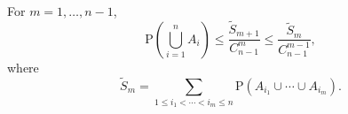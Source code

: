 For $m = 1, \ldots, n-1$,
$$\text{P}\left(\bigcup_{i=1}^{n} A_i\right) \leq \frac{\tilde{S}_{m+1}}{C_{n-1}^{m}} \leq \frac{\tilde{S}_m}{C_{n-1}^{m-1}},$$
where
$$\tilde{S}_m = \sum_{1 \leq i_1 < \cdots < i_m \leq n} \text{P}(A_{i_1} \cup \cdots \cup A_{i_m}).$$
